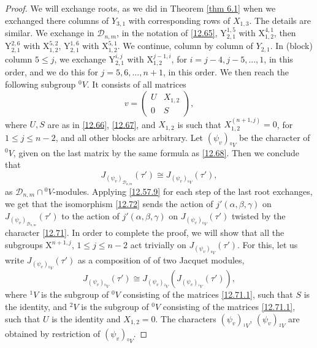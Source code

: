 \documentclass[12pts]{amsart}
\begin{document}
\begin{proof}
We will exchange roots, as we did in Theorem \ref{thm 6.1} when we exchanged there columns of $Y_{3,1}$ with corresponding rows of $X_{1,3}$. The details are similar. We exchange in $\mathcal{D}_{n,m}$, in the notation of \eqref{12.65}, $\mathrm{Y}_{2,1}^{1,5}$ with $\mathrm{X}_{1,2}^{4,1}$, then $\mathrm{Y}_{2,1}^{2,6}$ with $\mathrm{X}_{1,2}^{5,2}$, $\mathrm{Y}_{2,1}^{1,6}$ with $\mathrm{X}_{1,2}^{5,1}$. We continue, column by column of $Y_{2,1}$. In (block) column $5\leq j$, we exchange $\mathrm{Y}_{2,1}^{i,j}$ with $\mathrm{X}_{1,2}^{j-1,i}$, for $i=j-4,j-5,...,1$, in this order, and we do this for $j=5,6,...,n+1$, in this order. We then reach the following subgroup ${}^0V$. It consists of all matrices 
\begin{equation}\label{12.71.1}
v=\begin{pmatrix}U&X_{1,2}\\0&S\end{pmatrix},
\end{equation}
where $U, S$ are as in \eqref{12.66}, \eqref{12.67}, and $X_{1,2}$ is such that $X_{1,2}^{(n+1,j)}=0$, for $1\leq j\leq n-2$, and all other blocks are arbitrary. Let $(\psi_v)_{{}^0V}$ be the character of ${}^0V$, given on the last matrix by the same formula as \eqref{12.68}. Then we conclude that 
\begin{equation}\label{12.72}
J_{(\psi_v)_{\mathcal{D}_{n,m}}}(\tau')\cong J_{(\psi_v)_{{}^0V}}(\tau'),
\end{equation}
as $\mathcal{D}_{n,m}\cap {}^0V$-modules. Applying \eqref{12.57.9} for each step of the last root exchanges, we get that the isomorphism \eqref{12.72} sends the action of $j'(\alpha, \beta, \gamma)$ on $J_{(\psi_v)_{\mathcal{D}_{n,m}}}(\tau')$ to the action of $j'(\alpha, \beta, \gamma)$ on $J_{(\psi_v)_{{}^0V}}(\tau')$ twisted by the character \eqref{12.71}. In order to complete the proof, we will show that all the subgroups $\mathrm{X}^{n+1,j}$, $1\leq j\leq n-2$ act trivially on $J_{(\psi_v)_{{}^0V}}(\tau')$.
For this, let us write $J_{(\psi_v)_{{}^0V}}(\tau')$ as a composition of of two Jacquet modules,
$$
J_{(\psi_v)_{{}^0V}}(\tau')\cong J_{(\psi_v)_{{}^2V}}(J_{(\psi_v)_{{}^1V}}(\tau')),
$$
where ${}^1V$ is the subgroup of ${}^0V$ consisting of the matrices \eqref{12.71.1}, such that $S$ is the identity, and ${}^2V$ is the subgroup of ${}^0V$ consisting of the matrices \eqref{12.71.1}, such that $U$ is the identity and $X_{1,2}=0$. The characters
$(\psi_v)_{{}^1V}$, $(\psi_v)_{{}^2V}$ are obtained by restriction of $(\psi_v)_{{}^0V}$.

\end{proof}
\end{document}
